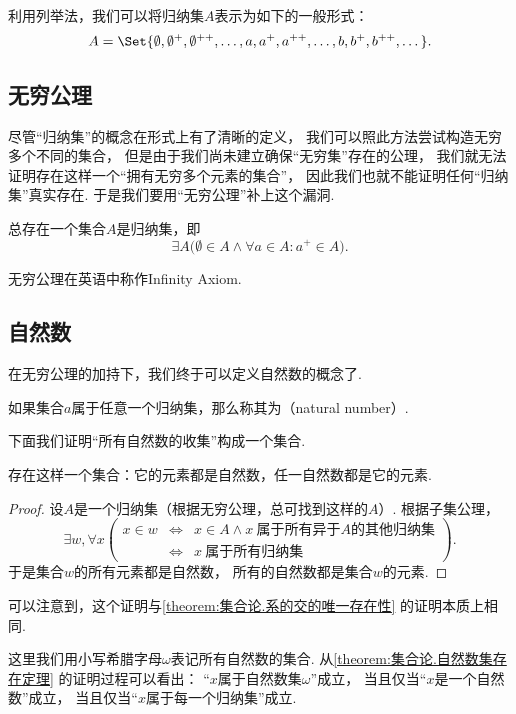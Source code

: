 利用列举法，我们可以将归纳集\(A\)表示为如下的一般形式：\[
	A = \Set{
		\emptyset, \emptyset^+, \emptyset^{++}, \dotsc,
		a, a^+, a^{++}, \dotsc,
		b, b^+, b^{++}, \dotsc
	}.
\]

\subsection{无穷公理}
尽管“归纳集”的概念在形式上有了清晰的定义，
我们可以照此方法尝试构造无穷多个不同的集合，
但是由于我们尚未建立确保“无穷集”存在的公理，
我们就无法证明存在这样一个“拥有无穷多个元素的集合”，
因此我们也就不能证明任何“归纳集”真实存在.
于是我们要用“无穷公理”补上这个漏洞.
\begin{axiom}[无穷公理]
总存在一个集合\(A\)是归纳集，即\[
	\exists A \bigl(
		\emptyset \in A
		\land
		\forall a \in A : a^+ \in A
	\bigr).
\]
\end{axiom}
无穷公理在英语中称作Infinity Axiom.

\subsection{自然数}
在无穷公理的加持下，我们终于可以定义自然数的概念了.
\begin{definition}\label{definition:集合论.自然数的定义}
如果集合\(a\)属于任意一个归纳集，那么称其为（natural number）.
\end{definition}

下面我们证明“所有自然数的收集”构成一个集合.
\begin{theorem}\label{theorem:集合论.自然数集存在定理}
存在这样一个集合：它的元素都是自然数，任一自然数都是它的元素.
\begin{proof}
设\(A\)是一个归纳集（根据无穷公理，总可找到这样的\(A\)）.
根据子集公理，%
\[
	\exists w,
	\forall x
	\left(
		\begin{array}{rcl}
			x \in w
			&\iff& x \in A \land x\ \text{属于所有异于\(A\)的其他归纳集} \\
			&\iff& x\ \text{属于所有归纳集}
		\end{array}
	\right).
\]
于是集合\(w\)的所有元素都是自然数，
所有的自然数都是集合\(w\)的元素.
\end{proof}
\end{theorem}
可以注意到，这个证明与\cref{theorem:集合论.系的交的唯一存在性} 的证明本质上相同.

这里我们用小写希腊字母\(\omega\)表记所有自然数的集合.
从\cref{theorem:集合论.自然数集存在定理} 的证明过程可以看出：
“\(x\)属于自然数集\(\omega\)”成立，
当且仅当“\(x\)是一个自然数”成立，
当且仅当“\(x\)属于每一个归纳集”成立.

